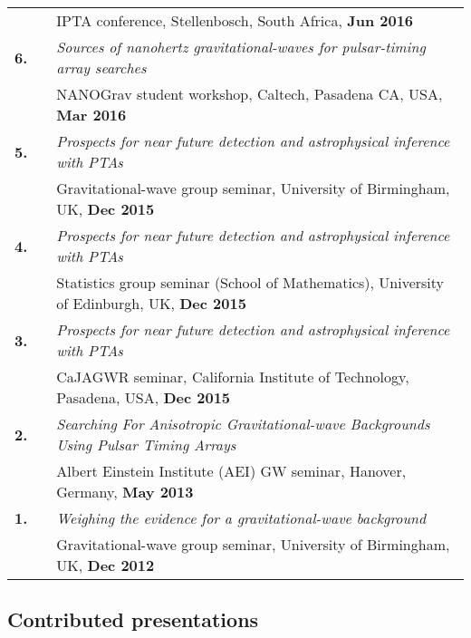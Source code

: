 \documentclass[11pt,letterpaper,sans]{moderncv}
\begin{document}
{\begin{longtable}{rp{0.3cm}p{15.8cm}}
&& IPTA conference, Stellenbosch, South Africa, \textbf{Jun 2016} \vspace{0.09cm}\\
\textbf{6.} & & \textit{Sources of nanohertz gravitational-waves for pulsar-timing array searches} \\ 
&& NANOGrav student workshop, Caltech, Pasadena CA, USA, \textbf{Mar 2016} \vspace{0.09cm}\\
\textbf{5.} & & \textit{Prospects for near future detection and astrophysical inference with PTAs} \\ 
&& Gravitational-wave group seminar, University of Birmingham, UK, \textbf{Dec 2015} \vspace{0.09cm}\\
\textbf{4.} & & \textit{Prospects for near future detection and astrophysical inference with PTAs} \\ 
&& Statistics group seminar (School of Mathematics), University of Edinburgh, UK, \textbf{Dec 2015} \vspace{0.09cm}\\
\textbf{3.} & & \textit{Prospects for near future detection and astrophysical inference with PTAs} \\ 
&& CaJAGWR seminar, California Institute of Technology, Pasadena, USA, \textbf{Dec 2015} \vspace{0.09cm}\\
\textbf{2.} & & \textit{Searching For Anisotropic Gravitational-wave Backgrounds Using Pulsar Timing Arrays} \\ 
&& Albert Einstein Institute (AEI) GW seminar, Hanover, Germany, \textbf{May 2013} \vspace{0.09cm}\\
\textbf{1.} & & \textit{Weighing the evidence for a gravitational-wave background} \\ 
&& Gravitational-wave group seminar, University of Birmingham, UK, \textbf{Dec 2012} 
\end{longtable}
}

\subsection{Contributed presentations} \vspace{-0.6cm}
\end{document}
